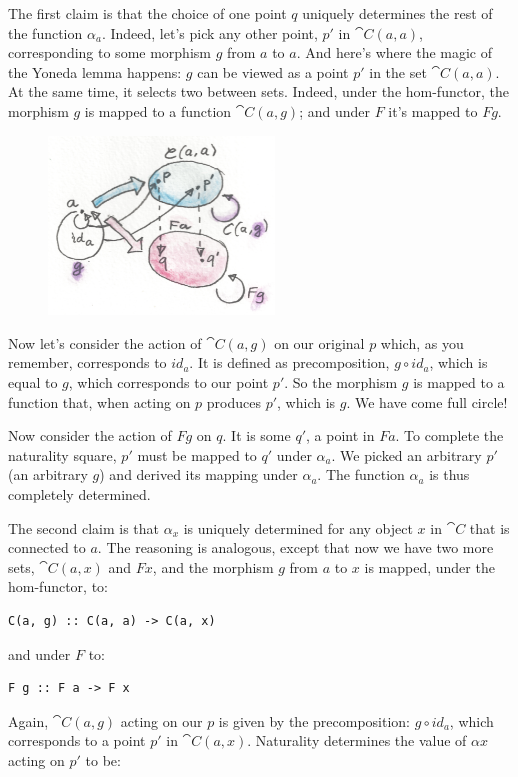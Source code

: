 \noindent
The first claim is that the choice of one point $q$ uniquely
determines the rest of the function $α_a$. Indeed, let's pick any
other point, $p'$ in $\cat{C}(a, a)$, corresponding to
some morphism $g$ from $a$ to $a$. And here's where
the magic of the Yoneda lemma happens: $g$ can be viewed as a
point $p'$ in the set $\cat{C}(a, a)$. At the same time,
it selects two  between sets. Indeed, under the
hom-functor, the morphism $g$ is mapped to a function
$\cat{C}(a, g)$; and under $F$ it's mapped to $F g$.

\begin{figure}[H]
\centering
\includegraphics[width=60mm]{images/yoneda4.png}
\end{figure}

\noindent
Now let's consider the action of $\cat{C}(a, g)$ on our original
$p$ which, as you remember, corresponds to $id_a$. It is
defined as precomposition, $g \circ id_a$, which is equal to $g$,
which corresponds to our point $p'$. So the morphism
$g$ is mapped to a function that, when acting on $p$
produces $p'$, which is $g$. We have come full
circle!

Now consider the action of $F g$ on $q$. It is some
$q'$, a point in $F a$. To complete the naturality
square, $p'$ must be mapped to $q'$ under
$α_a$. We picked an arbitrary $p'$ (an arbitrary
$g$) and derived its mapping under $α_a$. The function
$α_a$ is thus completely determined.

The second claim is that $α_x$ is uniquely determined for any
object $x$ in $\cat{C}$ that is connected to $a$. The
reasoning is analogous, except that now we have two more sets,
$\cat{C}(a, x)$ and $F x$, and the morphism $g$ from
$a$ to $x$ is mapped, under the hom-functor, to:

\begin{Verbatim}
C(a, g) :: C(a, a) -> C(a, x)
\end{Verbatim}
and under $F$ to:

\begin{Verbatim}
F g :: F a -> F x
\end{Verbatim}
Again, $\cat{C}(a, g)$ acting on our $p$ is given by the
precomposition: $g \circ id_a$, which corresponds to a point
$p'$ in $\cat{C}(a, x)$. Naturality determines the value
of $αx$ acting on $p'$ to be:

